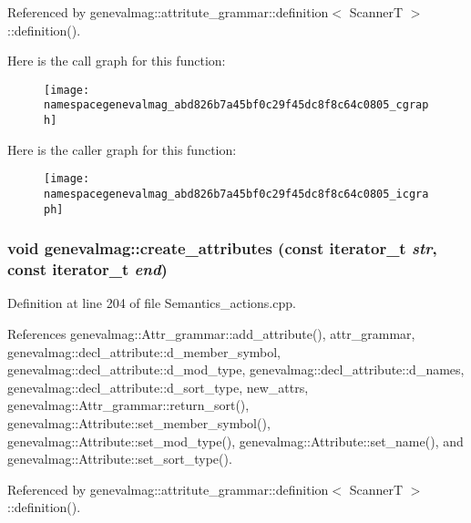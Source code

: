 Referenced by genevalmag::attritute\_\-grammar::definition$<$ ScannerT $>$::definition().



Here is the call graph for this function:\nopagebreak
\begin{figure}[H]
\begin{center}
\leavevmode
\texttt{[image: namespacegenevalmag\_abd826b7a45bf0c29f45dc8f8c64c0805\_cgraph]}
\end{center}
\end{figure}




Here is the caller graph for this function:\nopagebreak
\begin{figure}[H]
\begin{center}
\leavevmode
\texttt{[image: namespacegenevalmag\_abd826b7a45bf0c29f45dc8f8c64c0805\_icgraph]}
\end{center}
\end{figure}


\hypertarget{namespacegenevalmag_a640285acc8edfe19e082795784dbbd51}{
\subsubsection[{create\_\-attributes}]{\setlength{\rightskip}{0pt plus 5cm}void genevalmag::create\_\-attributes (const iterator\_\-t {\em str}, \/  const iterator\_\-t {\em end})}}
\label{namespacegenevalmag_a640285acc8edfe19e082795784dbbd51}


Definition at line 204 of file Semantics\_\-actions.cpp.



References genevalmag::Attr\_\-grammar::add\_\-attribute(), attr\_\-grammar, genevalmag::decl\_\-attribute::d\_\-member\_\-symbol, genevalmag::decl\_\-attribute::d\_\-mod\_\-type, genevalmag::decl\_\-attribute::d\_\-names, genevalmag::decl\_\-attribute::d\_\-sort\_\-type, new\_\-attrs, genevalmag::Attr\_\-grammar::return\_\-sort(), genevalmag::Attribute::set\_\-member\_\-symbol(), genevalmag::Attribute::set\_\-mod\_\-type(), genevalmag::Attribute::set\_\-name(), and genevalmag::Attribute::set\_\-sort\_\-type().



Referenced by genevalmag::attritute\_\-grammar::definition$<$ ScannerT $>$::definition().



